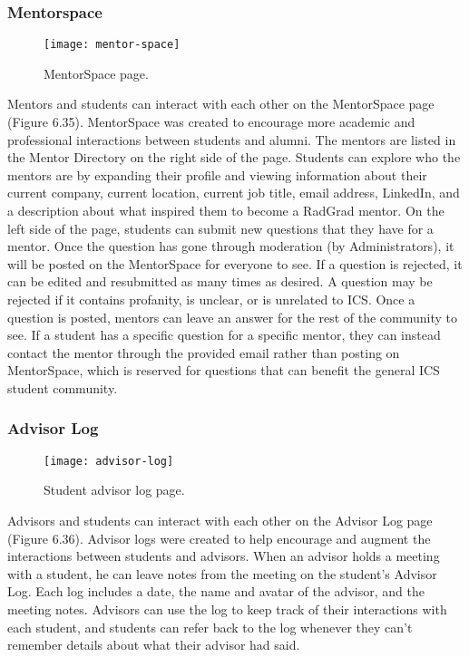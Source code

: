 \subsubsection{Mentorspace}
\begin{figure}[htbp!]
\centering
\texttt{[image: mentor-space]}
\caption{MentorSpace page.}
\end{figure}
Mentors and students can interact with each other on the MentorSpace page (Figure 6.35). MentorSpace was created to encourage more academic and professional interactions between students and alumni. The mentors are listed in the Mentor Directory on the right side of the page. Students can explore who the mentors are by expanding their profile and viewing information about their current company, current location, current job title, email address, LinkedIn, and a description about what inspired them to become a RadGrad mentor. On the left side of the page, students can submit new questions that they have for a mentor. Once the question has gone through moderation (by  Administrators), it will be posted on the MentorSpace for everyone to see. If a question is rejected, it can be edited and resubmitted as many times as desired. A question may be rejected if it contains profanity, is unclear, or is unrelated to ICS. Once a question is posted, mentors can leave an answer for the rest of the community to see. If a student has a specific question for a specific mentor, they can instead contact the mentor through the provided email rather than posting on MentorSpace, which is reserved for questions that can benefit the general ICS student community. 

\subsubsection{Advisor Log}
\begin{figure}[htbp!]
\centering
\texttt{[image: advisor-log]}
\caption{Student advisor log page.}
\end{figure}
Advisors and students can interact with each other on the Advisor Log page (Figure 6.36). Advisor logs were created to help encourage and augment the interactions between students and advisors. When an advisor holds a meeting with a student, he can leave notes from the meeting on the student's Advisor Log. Each log includes a date, the name and avatar of the advisor, and the meeting notes. Advisors can use the log to keep track of their interactions with each student, and students can refer back to the log whenever they can't remember details about what their advisor had said. 

